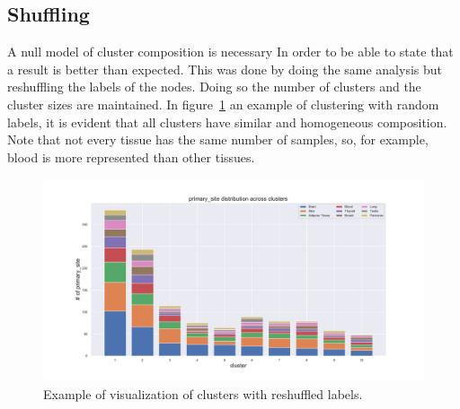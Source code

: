 \subsection{Shuffling}
A null model of cluster composition is necessary In order to be able to state that a result is better than expected. This was done by doing the same analysis but reshuffling the labels of the nodes. Doing so the number of clusters and the cluster sizes are maintained. In figure~\ref{fig:topic/gtex/oversigma_10tissue/shuffledclustercomposition_l3_primary_site} an example of clustering with random labels, it is evident that all clusters have similar and homogeneous composition. Note that not every tissue has the same number of samples, so, for example, blood is more represented than other tissues.
\begin{figure}[htb!]
	\centering
	\includegraphics[width=0.8\linewidth]{pictures/topic/gtex/oversigma_10tissue/shuffledclustercomposition_l3_primary_site}
	\caption{Example of visualization of clusters with reshuffled labels.}
	\label{fig:topic/gtex/oversigma_10tissue/shuffledclustercomposition_l3_primary_site}
\end{figure}

